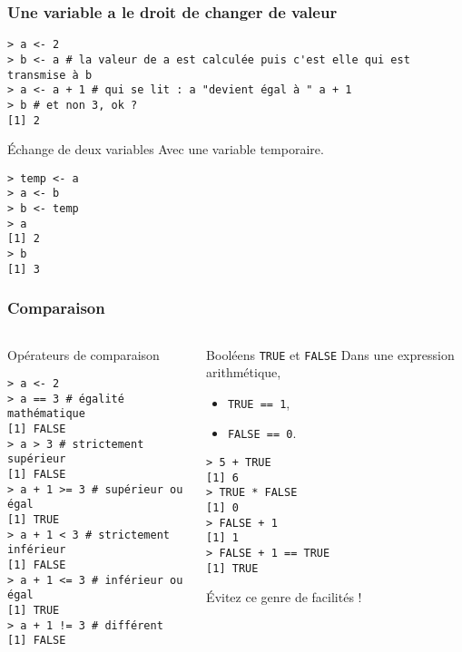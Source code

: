 \documentclass[10pt]{beamer}
\begin{document}
\begin{frame}[fragile]
  \frametitle{Une variable a le droit de changer de valeur}

  \begin{lstlisting}
> a <- 2
> b <- a # la valeur de a est calculée puis c'est elle qui est transmise à b
> a <- a + 1 # qui se lit : a "devient égal à " a + 1
> b # et non 3, ok ?
[1] 2
\end{lstlisting}


\begin{exampleblock}{Échange de deux variables}
  Avec une variable temporaire.
  \begin{lstlisting}[style=block]
> temp <- a
> a <- b
> b <- temp
> a
[1] 2
> b
[1] 3
  \end{lstlisting}
\end{exampleblock}
\end{frame}

\begin{frame}[fragile]
  \frametitle{Comparaison}
 
\begin{columns}[t]
\begin{column}{0.59\textwidth}
  \begin{block}{Opérateurs de comparaison}
  \begin{lstlisting}[style=block]
> a <- 2 
> a == 3 # égalité mathématique
[1] FALSE
> a > 3 # strictement supérieur 
[1] FALSE
> a + 1 >= 3 # supérieur ou égal
[1] TRUE
> a + 1 < 3 # strictement inférieur
[1] FALSE
> a + 1 <= 3 # inférieur ou égal
[1] TRUE
> a + 1 != 3 # différent
[1] FALSE
  \end{lstlisting}
\end{block}
\end{column}
\begin{column}{0.39\textwidth}
  \begin{block}{Booléens \texttt{TRUE} et \texttt{FALSE}}
    Dans une expression arithmétique,
    \begin{itemize}
    \item \texttt{TRUE == 1},
    \item \texttt{FALSE == 0}.
    \end{itemize}
  \begin{lstlisting}
> 5 + TRUE
[1] 6
> TRUE * FALSE
[1] 0
> FALSE + 1
[1] 1
> FALSE + 1 == TRUE
[1] TRUE
\end{lstlisting}
\alert{Évitez ce genre de facilités !}    
  \end{block}
\end{column}
\end{columns}
\end{frame}
\end{document}
